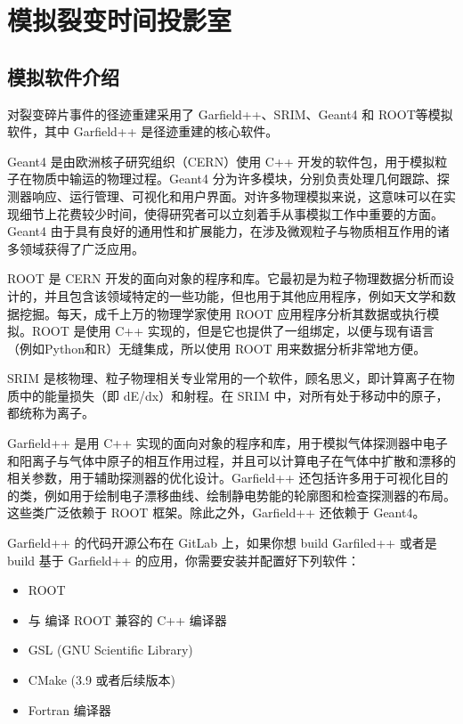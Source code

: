 \documentclass[AutoFakeBold]{LZUThesis}
\begin{document}
\section{模拟裂变时间投影室}
\subsection{模拟软件介绍}
对裂变碎片事件的径迹重建采用了 Garfield++、SRIM、Geant4 和 ROOT等模拟软件，其中 Garfield++ 是径迹重建的核心软件。

Geant4 是由欧洲核子研究组织（CERN）使用 C++ 开发的软件包，用于模拟粒子在物质中输运的物理过程。Geant4 分为许多模块，分别负责处理几何跟踪、探测器响应、运行管理、可视化和用户界面。对许多物理模拟来说，这意味可以在实现细节上花费较少时间，使得研究者可以立刻着手从事模拟工作中重要的方面。Geant4 由于具有良好的通用性和扩展能力，在涉及微观粒子与物质相互作用的诸多领域获得了广泛应用。

ROOT 是 CERN 开发的面向对象的程序和库。它最初是为粒子物理数据分析而设计的，并且包含该领域特定的一些功能，但也用于其他应用程序，例如天文学和数据挖掘。每天，成千上万的物理学家使用 ROOT 应用程序分析其数据或执行模拟。ROOT 是使用 C++ 实现的，但是它也提供了一组绑定，以便与现有语言（例如Python和R）无缝集成，所以使用 ROOT 用来数据分析非常地方便。

SRIM 是核物理、粒子物理相关专业常用的一个软件，顾名思义，即计算离子在物质中的能量损失（即 dE/dx）和射程。在 SRIM 中，对所有处于移动中的原子，都统称为离子。

Garfield++ 是用 C++ 实现的面向对象的程序和库，用于模拟气体探测器中电子和阳离子与气体中原子的相互作用过程，并且可以计算电子在气体中扩散和漂移的相关参数，用于辅助探测器的优化设计。Garfield++ 还包括许多用于可视化目的的类，例如用于绘制电子漂移曲线、绘制静电势能的轮廓图和检查探测器的布局。这些类广泛依赖于 ROOT 框架。除此之外，Garfield++ 还依赖于 Geant4。

Garfield++ 的代码开源公布在 GitLab 上，如果你想 build Garfiled++ 或者是 build 基于 Garfield++ 的应用，你需要安装并配置好下列软件\cite{schindler2019garfield}：

\begin{itemize}
    \item ROOT
    \item 与 编译 ROOT 兼容的 C++ 编译器
    \item GSL (GNU Scientific Library)
    \item CMake (3.9 或者后续版本)
    \item Fortran 编译器
\end{itemize}
\end{document}
